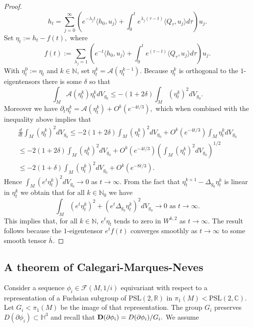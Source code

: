 \documentclass[11pt]{amsart}
\def\R{\mathbb R}
\def\H{\mathbb H}
\def\N{\mathbb N}
\def\C{\mathbb C}
\theoremstyle{remark}
\theoremstyle{definition}
\begin{document}
{{\begin{proof}
		$$h_t=\sum_{{j}=0}^{\infty}\left(e^{-\lambda_{j} t}\langle  h_0,u_{j}\rangle +\int_0^te^{\lambda_{j}(\tau-t)}\langle Q_\tau,u_{j}\rangle d\tau\right) u_{j}.$$
		{Set $\eta_t:=h_t-f(t),$ where
			$$f(t):=\sum_{\lambda_{j}=1}\left(e^{-t}\langle  h_0,u_{j}\rangle +\int_0^te^{(\tau-t)}\langle Q_\tau,u_{j}\rangle d\tau\right) u_{j}.$$
			With {$\eta_t^0:=\eta_t$ and $k\in\N$, set  $\eta^k_t=\mathcal A(\eta^{k-1}_t)$. Because $\eta^k_t$} is orthogonal to the $1$-eigentensors there is some $\delta$ so that
			$$\int_{M}\mathcal A({\eta^{k}_t})\eta^k_tdV_{g_0}\leq-(1+2\delta)\int_{M}({\eta^k_t})^2dV_{g_0}.$$
			{Moreover we have
			$\partial_t \eta^k_t=\mathcal A(\eta^k_t)+ O^k(e^{-4t/3}),$}
			which when combined with the inequality above  implies that
			\begin{multline*}
				\frac{d}{dt}\int_{M}(\eta^k_t)^2dV_{g_0}\leq -2(1+2\delta) \int_{M}(\eta^k_t)^2dV_{g_0}+O^k(e^{-4t/3}) \int_{M}\eta^k_tdV_{g_0}\\
				\leq -2(1+2\delta) \int_{M}(\eta^k_t)^2dV_{g_0}+O^k(e^{-4t/3})\left( \int_{M}(\eta^k_t)^2dV_{g_0}\right)^{1/2}\\
				\leq -2(1+\delta) \int_{M}(\eta^k_t)^2dV_{g_0}+O^k(e^{-8t/3}).
			\end{multline*}
			{Hence $\int_{M}(e^{t}\eta^k_t)^2dV_{g_0}\to 0$ as $t\to\infty$. } {From the fact that $\mathcal \eta^{k+1}_t-\Delta_{g_0}\eta^k_t$ is linear in $\eta^k_t$ we obtain that for all $k\in\N_0$ we have} 
			$$\int_{M}(e^{t}\eta^k_t)^2+(e^{t}\Delta_{g_0}\eta^k_t)^2dV_{g_0}\to 0\mbox{ as }t\to\infty.$$
			{This implies that, for all $k\in \N$, $e^{t}\eta_t$ tends to zero in $W^{k,2}$ as $t\to\infty$.} The result follows because the $1$-eigentensor $e^tf(t)$ converges  {smoothly}  as $t\to\infty$ to some smooth tensor $\bar h$.}
		\end{proof}
	
	\subsection{A theorem of Calegari-Marques-Neves} 
	Consider a sequence $\phi_i\in\mathcal F(M,1/i)$ equivariant  with respect to a representation of a Fuchsian subgroup of $\text{PSL}(2,\R)$ in $\pi_1(M)<\text{PSL}(2,\C)$. Let $G_i<\pi_1(M)$ be the image of that representation. The group $G_i$  preserves $D(\partial\phi_i)\subset \H^3$ and recall that ${\bf D}(\partial \phi_i)={D}(\partial \phi_i)/ G_i.$ We assume
	
}}
\end{document}
